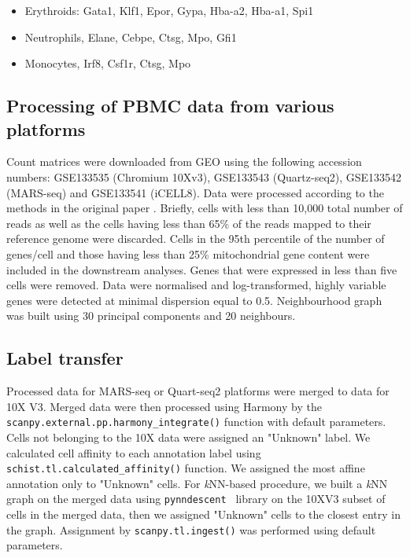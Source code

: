 \documentclass[10pt]{article}
\begin{document}
\begin{itemize}
\item Erythroids: Gata1, Klf1, Epor, Gypa, Hba-a2, Hba-a1, Spi1
\item Neutrophils, Elane, Cebpe, Ctsg, Mpo, Gfi1
\item Monocytes, Irf8, Csf1r, Ctsg, Mpo
\end{itemize}


\subsection*{Processing of PBMC data from various platforms}
Count matrices were downloaded from GEO using the following accession numbers: GSE133535 (Chromium 10Xv3), GSE133543 (Quartz-seq2), GSE133542 (MARS-seq) and GSE133541 (iCELL8). Data were processed according to the methods in the original paper \cite{mereu_2020}. Briefly, cells with less than 10,000 total number of reads as well as the cells having less than 65\% of the reads mapped to their reference genome were discarded. Cells in the 95th percentile of the number of genes/cell and those having less than 25\% mitochondrial gene content were included in the downstream analyses. Genes that were expressed in less than five cells were removed. Data were normalised and log-transformed, highly variable genes were detected at minimal dispersion equal to 0.5. Neighbourhood graph was built using 30 principal components and 20 neighbours. 


\subsection*{Label transfer}

Processed data for MARS-seq or Quart-seq2 platforms were merged to data for 10X V3. Merged data were then processed using Harmony \cite{Korsunsky_2019} by the \texttt{scanpy.external.pp.harmony\_integrate()} function with default parameters. Cells not belonging to the 10X data were assigned an "Unknown" label. We calculated cell affinity to each annotation label using \texttt{schist.tl.calculated\_affinity()} function. We assigned the most affine annotation only to "Unknown" cells. For \emph{k}NN-based procedure, we built a \emph{k}NN graph on the merged data using \texttt{pynndescent } library on the 10XV3 subset of cells in the merged data, then we assigned "Unknown" cells to the closest entry in the graph. Assignment by \texttt{scanpy.tl.ingest()} was performed using default parameters.
\end{document}
